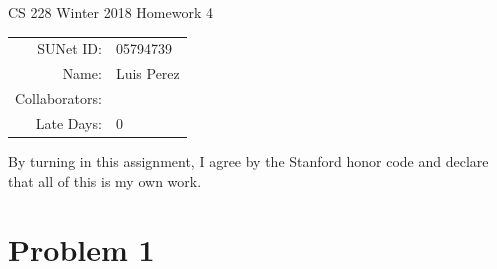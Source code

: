 \documentclass[12pt]{article}
\begin{document}
\begin{center}
{\Large CS 228 Winter 2018 Homework 4}

\begin{tabular}{rl}
SUNet ID: & 05794739 \\
Name: & Luis Perez \\
Collaborators: & \\
Late Days: & 0
\end{tabular}
\end{center}

By turning in this assignment, I agree by the Stanford honor code and declare
that all of this is my own work.

\section*{Problem 1}
\end{document}
